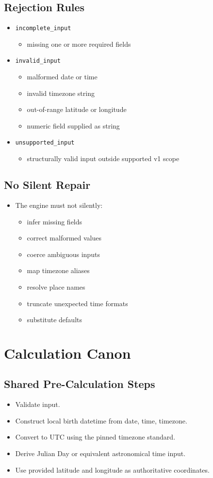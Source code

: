 \documentclass[11pt]{article}
\begin{document}
\subsection{Rejection Rules}
\label{sec:org8ced39f}
\begin{itemize}
\item \texttt{incomplete\_input}
\begin{itemize}
\item missing one or more required fields
\end{itemize}
\item \texttt{invalid\_input}
\begin{itemize}
\item malformed date or time
\item invalid timezone string
\item out-of-range latitude or longitude
\item numeric field supplied as string
\end{itemize}
\item \texttt{unsupported\_input}
\begin{itemize}
\item structurally valid input outside supported v1 scope
\end{itemize}
\end{itemize}
\subsection{No Silent Repair}
\label{sec:org8bc81f6}
\begin{itemize}
\item The engine must not silently:
\begin{itemize}
\item infer missing fields
\item correct malformed values
\item coerce ambiguous inputs
\item map timezone aliases
\item resolve place names
\item truncate unexpected time formats
\item substitute defaults
\end{itemize}
\end{itemize}
\section{Calculation Canon}
\label{sec:orga339fec}
\subsection{Shared Pre-Calculation Steps}
\label{sec:org61486c3}
\begin{itemize}
\item Validate input.
\item Construct local birth datetime from date, time, timezone.
\item Convert to UTC using the pinned timezone standard.
\item Derive Julian Day or equivalent astronomical time input.
\item Use provided latitude and longitude as authoritative coordinates.
\end{itemize}
\end{document}
